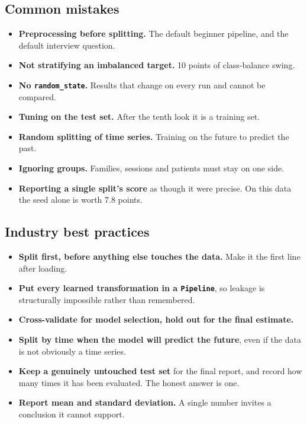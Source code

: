 \documentclass[11pt,a4paper]{article}
\begin{document}

\subsection*{Common mistakes}

\begin{itemize}\itemsep3pt
  \item \textbf{Preprocessing before splitting.} The default beginner pipeline, and the
        default interview question.
  \item \textbf{Not stratifying an imbalanced target.} 10 points of class-balance swing.
  \item \textbf{No \lstinline|random_state|.} Results that change on every run and cannot
        be compared.
  \item \textbf{Tuning on the test set.} After the tenth look it is a training set.
  \item \textbf{Random splitting of time series.} Training on the future to predict the
        past.
  \item \textbf{Ignoring groups.} Families, sessions and patients must stay on one side.
  \item \textbf{Reporting a single split's score} as though it were precise. On this data
        the seed alone is worth 7.8 points.
\end{itemize}

\subsection*{Industry best practices}

\begin{itemize}\itemsep3pt
  \item \textbf{Split first, before anything else touches the data.} Make it the first line
        after loading.
  \item \textbf{Put every learned transformation in a \lstinline|Pipeline|}, so leakage is
        structurally impossible rather than remembered.
  \item \textbf{Cross-validate for model selection, hold out for the final estimate.}
  \item \textbf{Split by time when the model will predict the future}, even if the data is
        not obviously a time series.
  \item \textbf{Keep a genuinely untouched test set} for the final report, and record how
        many times it has been evaluated. The honest answer is one.
  \item \textbf{Report mean and standard deviation.} A single number invites a conclusion it
        cannot support.
\end{itemize}
\end{document}
